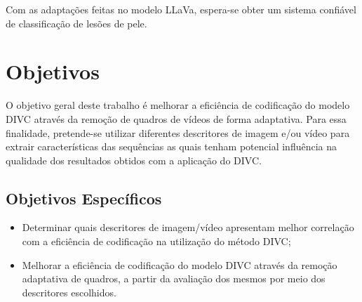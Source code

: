 Com as adaptações feitas no modelo \ac{LLaVa}, espera-se obter um sistema confiável de classificação de lesões de pele.

\section{Objetivos}

O objetivo geral deste trabalho é melhorar a eficiência de codificação do modelo \ac{DIVC} através da remoção de quadros de vídeos de forma adaptativa.
Para essa finalidade, pretende-se utilizar diferentes descritores de imagem e/ou vídeo para extrair características das sequências as quais tenham potencial influência na qualidade dos resultados obtidos com a aplicação do \ac{DIVC}.

\subsection*{Objetivos Específicos}

\begin{itemize}
    \item Determinar quais descritores de imagem/vídeo apresentam melhor correlação com a eficiência de codificação na utilização do método \ac{DIVC};
    \item Melhorar a eficiência de codificação do modelo \ac{DIVC} através da remoção adaptativa de quadros, a partir da avaliação dos mesmos por meio dos descritores escolhidos.
\end{itemize}
